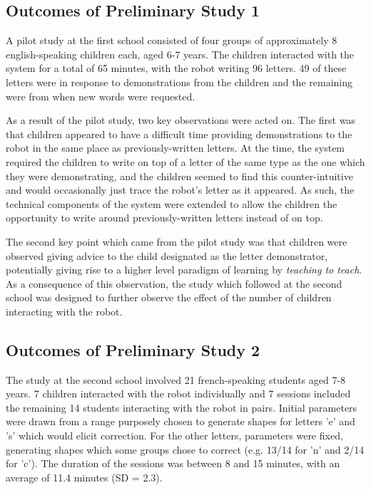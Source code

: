 \documentclass{sig-alternate}
\begin{document}
\subsection{Outcomes of Preliminary Study 1}


A pilot study at the first school consisted of four groups of
approximately 8 english-speaking children each, aged 6-7 years. The children
interacted with the system for a total of 65 minutes, with the robot writing 96
letters. 49 of these letters were in response to demonstrations from the children 
and the remaining were from when new words were requested. 

As a result of the pilot study, two key observations were acted on. The first
was that children appeared to have a difficult time providing demonstrations to
the robot in the same place as previously-written letters. At the time, the
system required the children to write on top of a letter of the same type as the
one which they were demonstrating, and the children seemed to find this
counter-intuitive and would occasionally just trace the robot's letter as it
appeared. As such, the technical components of the system were extended to allow
the children the opportunity to write around previously-written letters instead
of on top. 

The second key point which came from the pilot study was that children were
observed giving advice to the child designated as the letter demonstrator,
potentially giving rise to a higher level paradigm of learning by
\emph{teaching to teach}. As a consequence of this observation, the study which
followed at the second school was designed to further observe the effect of the
number of children interacting with the robot.

\subsection{Outcomes of Preliminary Study 2}
The study at the second school involved 21 french-speaking students aged 7-8 years. 7 children
interacted with the robot individually and 7 sessions included the remaining
14 students interacting with the robot in pairs.
Initial parameters were drawn from a range purposely chosen to generate shapes 
for letters 'e' and 's' which would elicit correction. For the other letters, 
parameters were fixed, generating shapes which some groups chose to correct 
(e.g. 13/14 for 'n' and 2/14 for 'c'). The duration of the sessions
was between 8 and 15 minutes, with an average of 11.4 minutes (SD = 2.3). 
\end{document}
